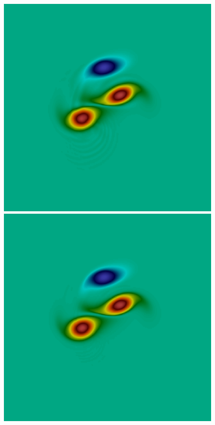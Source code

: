 \begin{figure}[t]
\includegraphics[scale=0.06]{data/Incompressible_Euler/Snapshots/red_17_2.png}\hspace{1em}
\includegraphics[scale=0.06]{data/Incompressible_Euler/Snapshots/red_35_2.png}\hspace{1em}

\end{figure}
